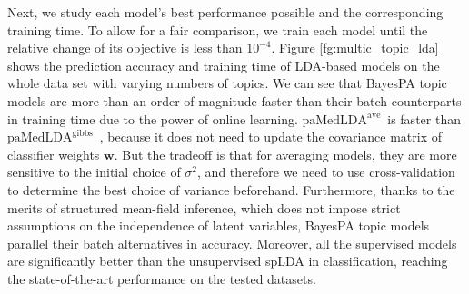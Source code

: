 \documentclass[twoside,11pt]{article}
\newcommand{\wv}{\bm{w}}
\newcommand\paMedLDAave{$\text{paMedLDA}^{\text{ave}}$~}
\newcommand\paMedLDAgibbs{$\text{paMedLDA}^{\text{gibbs}}$~}
\begin{document}
Next, we study each model's best performance possible and the corresponding training time.
To allow for a fair comparison, we train each model until the relative change of  its objective is less than $10^{-4}$.
 Figure \ref{fg:multic_topic_lda} shows the prediction accuracy and training time of LDA-based models on the whole data set with varying numbers of topics. We can see that BayesPA topic models are more than an order of magnitude faster than their batch counterparts in training time due to the power of online learning. \paMedLDAave is faster than \paMedLDAgibbs, because it does not need to update the covariance matrix of classifier weights $\wv$. But the tradeoff is that for averaging models, they are more sensitive to the initial choice of $\sigma^2$, and therefore we need to use cross-validation to determine the best choice of variance beforehand.
Furthermore, thanks to the merits of structured mean-field inference, which does not impose strict assumptions on the independence of latent variables, BayesPA topic models parallel their batch alternatives in accuracy. Moreover, all the supervised models are significantly better than the unsupervised spLDA in classification, reaching the state-of-the-art performance on the tested datasets.
\end{document}
